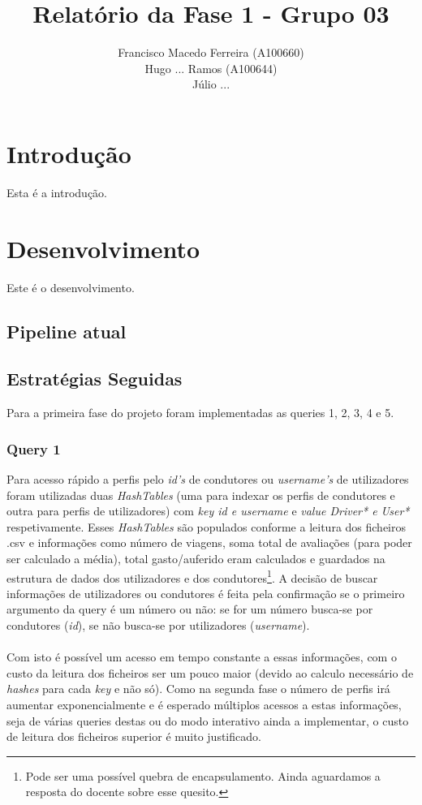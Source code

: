 \documentclass{article}
\title{Relatório da Fase 1 - Grupo 03}
\author{Francisco Macedo Ferreira (A100660)\\Hugo ... Ramos (A100644)\\Júlio ...}
\begin{document}
    \maketitle

    \section{Introdução}

    Esta é a introdução.

    \section{Desenvolvimento}

        Este é o desenvolvimento.

        \subsection{Pipeline atual}

        \subsection{Estratégias Seguidas}

        Para a primeira fase do projeto foram implementadas as queries 1, 2, 3, 4 e 5.

        \subsubsection{Query 1}
            Para acesso rápido a perfis pelo \emph{id's} de condutores ou 
            \emph{username's} de utilizadores foram utilizadas duas 
            \emph{HashTables} (uma para indexar os perfis de condutores e outra 
            para perfis de utilizadores) com \emph{key id e username} e 
            \emph{value Driver* e User*} respetivamente. Esses \emph{HashTables}
            são populados conforme a leitura dos ficheiros {.csv} e informações
            como número de viagens, soma total de avaliações (para poder ser 
            calculado a média), total gasto/auferido eram calculados e guardados 
            na estrutura de dados dos utilizadores e dos condutores\footnote{Pode 
            ser uma possível quebra de encapsulamento. Ainda aguardamos a resposta
            do docente sobre esse quesito.}. A decisão de buscar informações de
            utilizadores ou condutores é feita pela confirmação se o primeiro 
            argumento da query é um número ou não: se for um número busca-se por
            condutores (\emph{id}), se não busca-se por utilizadores (\emph{username}).
            \\
            \\Com isto é possível um acesso em tempo constante a essas
            informações, com o custo da leitura dos ficheiros ser um pouco maior
            (devido ao calculo necessário de \emph{hashes} para cada \emph{key} 
            e não só). Como na segunda fase o número de perfis irá aumentar
            exponencialmente e é esperado múltiplos acessos a estas informações, 
            seja de várias queries destas ou do modo interativo ainda a 
            implementar, o custo de leitura dos ficheiros superior é muito 
            justificado.
\end{document}
